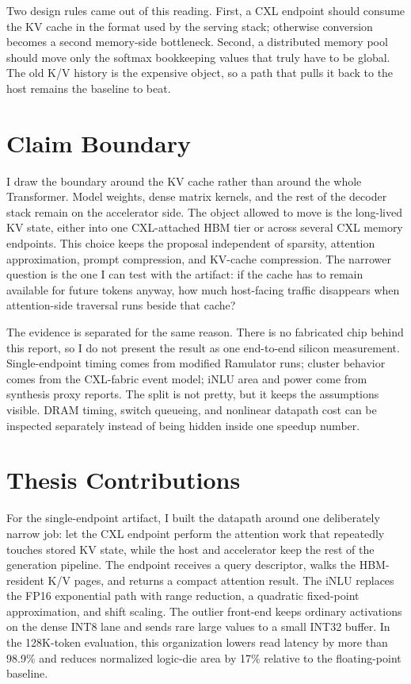 Two design rules came out of this reading. First, a CXL endpoint should consume the KV cache in the format used by the serving stack; otherwise conversion becomes a second memory-side bottleneck. Second, a distributed memory pool should move only the softmax bookkeeping values that truly have to be global. The old K/V history is the expensive object, so a path that pulls it back to the host remains the baseline to beat.

\section{Claim Boundary}
I draw the boundary around the KV cache rather than around the whole Transformer. Model weights, dense matrix kernels, and the rest of the decoder stack remain on the accelerator side. The object allowed to move is the long-lived KV state, either into one CXL-attached HBM tier or across several CXL memory endpoints. This choice keeps the proposal independent of sparsity, attention approximation, prompt compression, and KV-cache compression. The narrower question is the one I can test with the artifact: if the cache has to remain available for future tokens anyway, how much host-facing traffic disappears when attention-side traversal runs beside that cache?

The evidence is separated for the same reason. There is no fabricated chip behind this report, so I do not present the result as one end-to-end silicon measurement. Single-endpoint timing comes from modified Ramulator runs; cluster behavior comes from the CXL-fabric event model; iNLU area and power come from synthesis proxy reports. The split is not pretty, but it keeps the assumptions visible. DRAM timing, switch queueing, and nonlinear datapath cost can be inspected separately instead of being hidden inside one speedup number.

\section{Thesis Contributions}
For the single-endpoint artifact, I built the datapath around one deliberately narrow job: let the CXL endpoint perform the attention work that repeatedly touches stored KV state, while the host and accelerator keep the rest of the generation pipeline. The endpoint receives a query descriptor, walks the HBM-resident K/V pages, and returns a compact attention result. The iNLU replaces the FP16 exponential path with range reduction, a quadratic fixed-point approximation, and shift scaling. The outlier front-end keeps ordinary activations on the dense INT8 lane and sends rare large values to a small INT32 buffer. In the 128K-token evaluation, this organization lowers read latency by more than 98.9\% and reduces normalized logic-die area by 17\% relative to the floating-point baseline.

